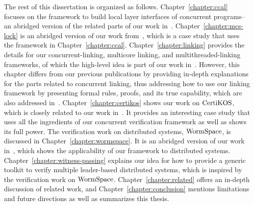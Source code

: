 The rest of this dissertation is organized as follows. Chapter~\ref{chapter:ccal} focuses on the framework to build local layer 
interfaces of concurrent programs--an abridged version of the related parts of our work in~\cite{concurrency}.
Chapter~\ref{chapter:mcs-lock} is an abridged version of our work from~\cite{mcslock},
which is a case study that uses the framework in Chapter~\ref{chapter:ccal}. 
Chapter~\ref{chapter:linking} provides the details for our concurrent-linking, multicore linking, and multithreaded-linking frameworks, 
of which the high-level idea is part of our work in~\cite{concurrency}.
However, this chapter differs from our previous publications by providing in-depth explanations for the parts related to concurrent linking, 
thus addressing how to use our linking framework by presenting formal rules, proofs, and its true capability, 
which are also addressed in~\cite{concurrency}.
Chapter~\ref{chapter:certikos} shows our work on $\mathrm{CertiKOS}$,
which is closely related to our work in~\cite{certikos:osdi16}. 
It provides an interesting case study that uses all the ingredients of our concurrent verification
 framework as well as shows its full power. The verification work on distributed systems, $\mathrm{WormSpace}$,
is discussed in Chapter~\ref{chapter:wormspace}.
It is an abridged version of our work in~\cite{wormspace},
which shows the applicability of our framework to distributed systems. 
Chapter~\ref{chapter:witness-passing} 
explains our idea for how to provide a generic toolkit to verify multiple leader-based distributed systems, 
which is inspired by the verification work on $\mathrm{WormSpace}$.
Chapter~\ref{chapter:related}
offers an in-depth discussion of related work, and  Chapter~\ref{chapter:conclusion}  
mentions limitations and future directions as well as summarizes this thesis.
